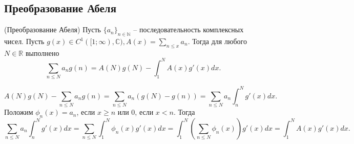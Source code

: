 \subsection{Преобразование Абеля}
\begin{lemma}(Преобразование Абеля) \label{l3_Abel_transform}
	Пусть $\lbrace a_n \rbrace_{n \in \mathbb{N}}$ -- последовательность комплексных чисел. Пусть $\displaystyle g(x) \in C^1([1; \infty), \mathbb{C}), A(x) = \sum\limits_{n \leq x} a_n$. Тогда для любого $N \in \mathbb{R}$ выполнено
	$$\sum_{n \leq N} a_n g(n) = A(N) g(N) - \int_{1}^{N} A(x) g'(x) dx.$$
\end{lemma}
\begin{pf}
	$$A(N) g(N)- \sum_{n \leq N} a_n g(n) = \sum_{n \leq N} a_n (g(N) - g(n)) = \sum_{n \leq N} a_n \int_{n}^{N} g'(x) dx.$$
	Положим $\phi_n(x)= a_n$, если $x \geq n$ или 0, если $x < n$. Тогда 
	$$\sum_{n \leq N} a_n \int_{n}^{N} g'(x) dx = \sum_{n \leq N} \int_{1}^{N} \phi_n(x) g'(x) dx = \int_{1}^{N} \left( \sum_{n \leq N} \phi_n(x) \right) g'(x) dx = \int_{1}^{N} A(x) g'(x) dx.$$
\end{pf}

